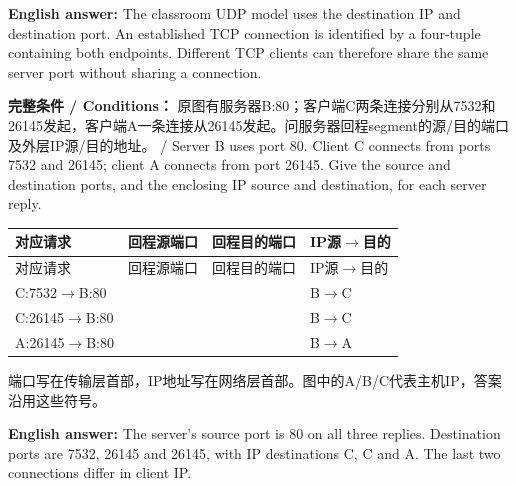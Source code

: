 \textbf{English answer:} The classroom UDP model uses the destination IP and destination port. An established TCP connection is identified by a four-tuple containing both endpoints. Different TCP clients can therefore share the same server port without sharing a connection.








\textbf{完整条件 / Conditions：} 原图有服务器B:80；客户端C两条连接分别从7532和26145发起，客户端A一条连接从26145发起。问服务器回程segment的源/目的端口及外层IP源/目的地址。 / Server B uses port 80. Client C connects from ports 7532 and 26145; client A connects from port 26145. Give the source and destination ports, and the enclosing IP source and destination, for each server reply.




\begingroup
\small\setlength{\tabcolsep}{3pt}
\renewcommand{\arraystretch}{1.22}
\begin{longtable}{@{}>{\raggedright\arraybackslash}p{}>{\raggedright\arraybackslash}p{}>{\raggedright\arraybackslash}p{}>{\raggedright\arraybackslash}p{}@{}}
\toprule
对应请求 & 回程源端口 & 回程目的端口 & IP源\ensuremath{\to}目的 \\
\midrule\endfirsthead
对应请求 & 回程源端口 & 回程目的端口 & IP源\ensuremath{\to}目的 \\
\midrule\endhead
\bottomrule\endfoot
C:7532\ensuremath{\to}B:80 & 80 & 7532 & B\ensuremath{\to}C \\
C:26145\ensuremath{\to}B:80 & 80 & 26145 & B\ensuremath{\to}C \\
A:26145\ensuremath{\to}B:80 & 80 & 26145 & B\ensuremath{\to}A \\
\end{longtable}
\endgroup


端口写在传输层首部，IP地址写在网络层首部。图中的A/B/C代表主机IP，答案沿用这些符号。


\textbf{English answer:} The server's source port is 80 on all three replies. Destination ports are 7532, 26145 and 26145, with IP destinations C, C and A. The last two connections differ in client IP.


